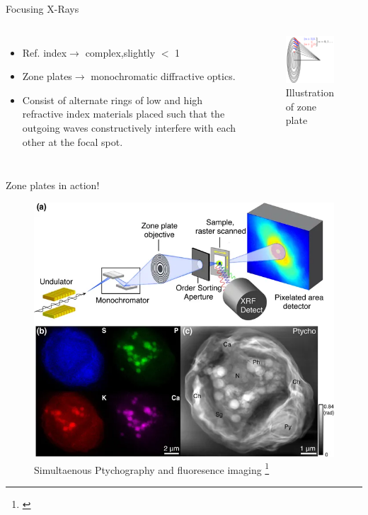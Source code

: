 \documentclass{beamer}
\begin{document}
\begin{frame}{Focusing X-Rays}
	\begin{block}{}
		\begin{columns}[onlytextwidth,T]
			\column{\dimexpr\linewidth-30mm-10mm}
			\begin{itemize}
			\item Ref. index$\rightarrow$ complex,slightly $<$ 1
			\item Zone plates$\rightarrow$ monochromatic diffractive optics.
			\item Consist of alternate rings of low and high refractive index materials placed such that the outgoing waves constructively interfere with each other at the focal spot.
			\end{itemize}
			\column{30mm}
			\begin{figure}
				\includegraphics[width=40mm]{zp}
				\caption{Illustration of zone plate \footnotemark}
			\end{figure}
		\end{columns}
	\end{block}
\end{frame}

\begin{frame}{Zone plates in action!}
		\begin{center}
			\begin{figure}
				\includegraphics[scale=0.28]{junjing}
				\caption{Simultaenous Ptychography and fluoresence imaging \footnote{\cite{junjing}}}
			\end{figure}
		\end{center}	
\end{frame}
\end{document}
